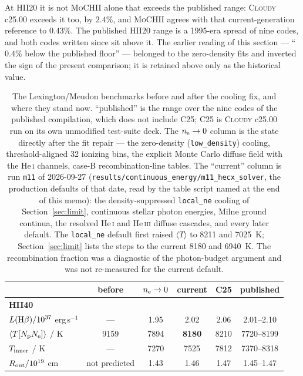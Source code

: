 \documentclass[english,a4paper]{my_memo}
\newcommand{\code}[1]{\texttt{#1}}
\newcommand{\MoCHII}{\textsc{MoCHII}}
\newcommand{\Cloudy}{\textsc{Cloudy}}
\newcommand{\HeI}{He\,\textsc{i}}
\newcommand{\HeIII}{He\,\textsc{iii}}
\newcommand{\nel}{n_{\rm e}}
\begin{document}
\noindent
At HII20 it is not \MoCHII{} alone that exceeds the published range: \Cloudy{}
c25.00 exceeds it too, by $2.4\%$, and \MoCHII{} agrees with that
current-generation reference to $0.43\%$.  The published HII20 range is a
1995-era spread of nine codes, and both codes written since sit above it.  The
earlier reading of this section --- ``$0.4\%$ below the published floor'' ---
belonged to the zero-density fits and inverted the sign of the present
comparison; it is retained above only as the historical value.

\begin{table}[htbp]
\centering
\caption{The Lexington/Meudon benchmarks before and after the cooling fix, and
where they stand now.  ``published'' is the range over the nine codes of the
published compilation, which does not include C25; C25 is \Cloudy{} c25.00 run
on its own unmodified test-suite deck.  The $\nel \to 0$ column is the state
directly after the fit repair --- the zero-density (\code{low\_density})
cooling, threshold-aligned 32 ionizing bins, the explicit Monte Carlo diffuse
field with the \HeI{} channels, case-B recombination-line tables.  The
``current'' column is run \code{m11} of 2026-09-27
(\code{results/\allowbreak continuous\_energy/\allowbreak m11\_hecx\_solver},
the production defaults of that date, read by the table script named at the end
of this memo): the density-suppressed \code{local\_ne} cooling of
Section~\ref{sec:limit}, continuous stellar photon energies, Milne ground
continua, the resolved \HeI{} and \HeIII{} diffuse cascades, and every later
default.  The \code{local\_ne} default first raised $\langle T\rangle$ to 8211
and 7025~K; Section~\ref{sec:limit} lists the steps to the current 8180 and
6940~K.  The recombination fraction was a diagnostic of the photon-budget
argument and was not re-measured for the current default.}
\label{tab:bench}
\begin{tabular}{lccccc}
\toprule
 & before & $\nel \to 0$ & current & C25 & published \\
\midrule
\multicolumn{6}{l}{\textbf{HII40}} \\
$L({\rm H}\beta)/10^{37}$ erg\,s$^{-1}$ & --- & 1.95 & 2.02 & 2.06 & 2.01--2.10 \\
$\langle T[N_{\rm p}N_{\rm e}]\rangle$ / K & 9159 & 7894 & \textbf{8180} & 8210 & 7720--8199 \\
$T_{\rm inner}$ / K                     & ---  & 7270 & 7525 & 7812 & 7370--8318 \\
$R_{\rm out}/10^{19}$ cm                & not predicted & 1.43 & 1.46 & 1.47 & 1.45--1.47 \\

\end{tabular}
\end{table}
\end{document}
